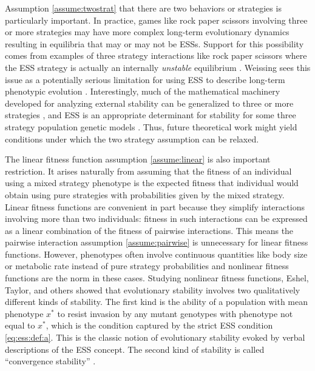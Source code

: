 \documentclass[11pt]{article}
\newcommand{\ess}[1]{#1^*}
\begin{document}
Assumption \ref{assume:twostrat} that there are two behaviors or strategies is particularly important. In practice, games like rock paper scissors \cite{Taylor:Jonker:1978,Zeeman:1980,Weissing:1991,Hofbauer:Sigmund:1998} involving three or more strategies may have more complex long-term evolutionary dynamics resulting in equilibria that may or may not be ESSs. Support for this possibility comes from examples of three strategy interactions like rock paper scissors where the ESS strategy is actually an internally \textit{unstable} equilibrium \cites{Friedman:1991,Weissing:1991}. Weissing sees this issue as a potentially serious limitation for using ESS to describe long-term phenotypic evolution \cite{Weissing:1996}.
Interestingly, much of the mathematical machinery developed for analyzing external stability can be generalized to three or more strategies \cite[e.g.,][]{Eshel:Feldman:1984,Weissing:1996,Eshel:Feldman:1998,Hofbauer:Sigmund:1998}, and ESS is an appropriate determinant for stability for some three strategy population genetic models \cite[e.g., single-locus three-allele models in continuous time][]{Cressman:Hofbauer:1996}. Thus, future theoretical work might yield conditions under which the two strategy assumption can be relaxed.

The linear fitness function assumption \ref{assume:linear} is also important restriction. It arises naturally from assuming that the fitness of an individual using a mixed strategy phenotype is the expected fitness that individual would obtain using pure strategies with probabilities given by the mixed strategy. Linear fitness functions are convenient in part because they simplify interactions involving more than two individuals: fitness in such interactions can be expressed as a linear combination of the fitness of pairwise interactions. This means the pairwise interaction assumption \ref{assume:pairwise} is unnecessary for linear fitness functions. However, phenotypes often involve continuous quantities like body size or metabolic rate instead of pure strategy probabilities and nonlinear fitness functions are the norm in these cases. Studying nonlinear fitness functions, Eshel, Taylor, and others \cite{Eshel:Motro:1981,Eshel:1983,Taylor:1989,Christiansen:1991,Metz:Geritz:1996,Eshel:Motro:1997,Geritz:Kisdi:1998} showed that evolutionary stability involves two qualitatively different kinds of stability. The first kind is the ability of a population with mean phenotype $\ess{x}$ to resist invasion by any mutant genotypes with phenotype not equal to $\ess{x}$, which is the condition captured by the strict ESS condition \eqref{eq:ess:def:a}. This is the classic notion of evolutionary stability evoked by verbal descriptions of the ESS concept. The second kind of stability is called ``convergence stability'' \cite{Christiansen:1991,Eshel:1996,Geritz:Kisdi:1998}.
\end{document}
